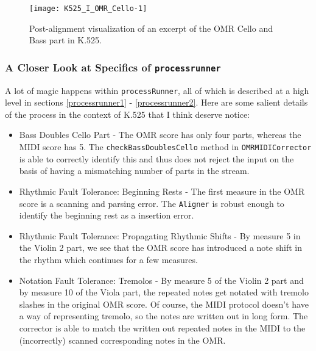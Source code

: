 \begin{figure}[H]
\centering
\texttt{[image: K525\_I\_OMR\_Cello-1]}
\caption{Post-alignment visualization of an excerpt of the OMR Cello and Bass part in K.525.}
\end{figure}

\subsubsection{A Closer Look at Specifics of \texttt{processrunner}}
A lot of magic happens within \texttt{processRunner}, all of which is described at a high level in sections \ref{processrunner1} - \ref{processrunner2}. Here are some salient details of the process in the context of K.525 that I think deserve notice:
\begin{itemize}
\item Bass Doubles Cello Part - The OMR score has only four parts, whereas the MIDI score has 5. The \texttt{checkBassDoublesCello} method in \texttt{OMRMIDICorrector} is able to correctly identify this and thus does not reject the input on the basis of having a mismatching number of parts in the stream. 
\item Rhythmic Fault Tolerance: Beginning Rests - The first measure in the OMR score is a scanning and parsing error. The \texttt{Aligner} is robust enough to identify the beginning rest as a insertion error. 
\item Rhythmic Fault Tolerance: Propagating Rhythmic Shifts - By measure 5 in the Violin 2 part, we see that the OMR score has introduced a  note shift in the rhythm which continues for a few measures. 
\item Notation Fault Tolerance: Tremolos - By measure 5 of the Violin 2 part and by measure 10 of the Viola part, the repeated  notes get notated with tremolo slashes in the original OMR score. Of course, the MIDI protocol doesn't have a way of representing tremolo, so the notes are written out in long form. The corrector is able to match the written out repeated notes in the MIDI to the (incorrectly) scanned corresponding notes in the OMR. 
\end{itemize}

